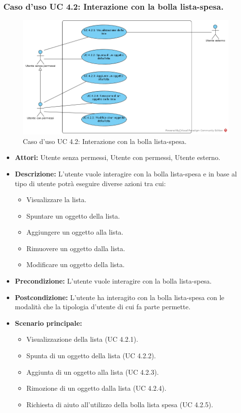 \newpage
\subsubsection{Caso d'uso UC 4.2: Interazione con la bolla lista-spesa.}
\label{Caso d'uso UC 4.2: Interazione con la bolla lista-spesa.}
\begin{figure}[ht]
	\centering
	\includegraphics[scale=0.60]{Usecases/img/UC4.2.png}
	\caption{Caso d'uso UC 4.2: Interazione con la bolla lista-spesa.}
\end{figure}

\FloatBarrier
\begin{itemize}
\item \textbf{Attori:} Utente senza permessi, Utente con permessi, Utente esterno.
\item \textbf{Descrizione:} L'utente vuole interagire con la bolla lista-spesa e in base al tipo di utente potrà eseguire diverse azioni tra cui:
\begin{itemize}
\item Visualizzare la lista.
\item Spuntare un oggetto della lista.
\item Aggiungere un oggetto alla lista.
\item Rimuovere un oggetto dalla lista.
\item Modificare un oggetto della lista.
\end{itemize}
\item \textbf{Precondizione:} L'utente vuole interagire con la bolla lista-spesa. 
\item \textbf{Postcondizione:} L'utente ha interagito con la bolla lista-spesa con le modalità che la tipologia d'utente di cui fa parte permette.
\item \textbf{Scenario principale:}
	\begin{itemize}
	\item{Visualizzazione della lista (UC 4.2.1).}
	\item{Spunta di un oggetto della lista (UC 4.2.2).}
	\item{Aggiunta di un oggetto alla lista (UC 4.2.3).}
	\item{Rimozione di un oggetto dalla lista (UC 4.2.4).}
	\item{Richiesta di aiuto all'utilizzo della bolla lista spesa (UC 4.2.5).}
	\end{itemize}
\end{itemize}